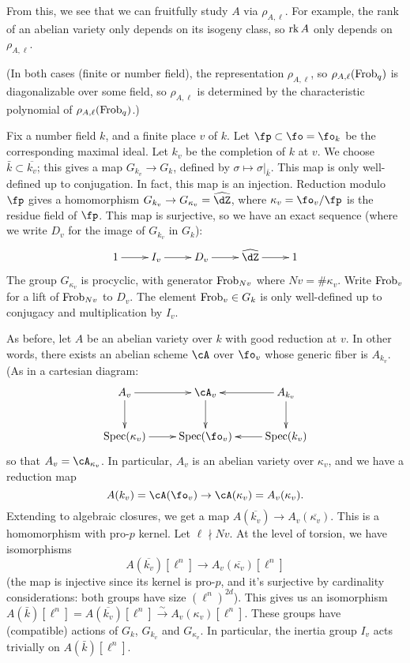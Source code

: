 From this, we see that we can fruitfully study $A$ via $\rho_{A,\ell}$. For 
example, the rank of an abelian variety only depends on its isogeny class, so 
$\operatorname{rk} A$ only depends on $\rho_{A,\ell}$. 

(In both cases (finite or number field), the representation 
$\rho_{A,\ell}$, so $\rho_{A,\ell}(\mathrm{Frob}_q)$ is diagonalizable over some 
field, so $\rho_{A,\ell}$ is determined by the characteristic polynomial of 
$\rho_{A,\ell}(\mathrm{Frob}_q)$.)

Fix a number field $k$, and a finite place $v$ of $k$. Let 
$\fp\subset \fo=\fo_k$ be the corresponding maximal ideal. Let $k_v$ be the 
completion of $k$ at $v$. We choose $\bar k\subset \overline{k_v}$; this gives 
a map $G_{k_v} \to G_k$, defined by $\sigma\mapsto \sigma|_{\bar k}$. This map 
is only well-defined up to conjugation. In fact, this map is an injection. 
Reduction modulo $\fp$ gives a homomorphism 
$G_{k_v} \to G_{\kappa_v}=\widehat\dZ$, where $\kappa_v = \fo_v/\fp$ is the 
residue field of $\fp$. This map is surjective, so we have an exact sequence 
(where we write $D_v$ for the image of $G_{k_v}$ in $G_k$):
\[\xymatrix{
  1 \ar[r] 
    & I_v \ar[r] 
    & D_v \ar[r] 
    & \widehat\dZ \ar[r] 
    & 1
}\]
The group $G_{\kappa_v}$ is procyclic, with generator 
$\mathrm{Frob}_{N v}$ where $N v = \# \kappa_v$. Write $\mathrm{Frob}_v$ for a lift of 
$\mathrm{Frob}_{N v}$ to $D_v$. The element $\mathrm{Frob}_v\in G_k$ is only well-defined up to 
conjugacy and multiplication by $I_v$. 

As before, let $A$ be an abelian variety over $k$ with good reduction at $v$. 
In other words, there exists an abelian scheme $\cA$ over $\fo_v$ whose generic 
fiber is $A_{k_v}$. (As in a cartesian diagram:
\[\xymatrix{
  A_v \ar[r] \ar[d] 
    & \cA_v \ar[d] 
    & A_{k_v} \ar[l] \ar[d] \\
  \spec(\kappa_v) \ar[r] 
    & \spec(\fo_v) 
    & \spec(k_v) \ar[l] 
}\]
so that $A_v = \cA_{\kappa_v}$. In particular, $A_v$ is an abelian variety over 
$\kappa_v$, and we have a reduction map 
\[
  A(k_v) = \cA(\fo_v) \to \cA(\kappa_v) = A_v(\kappa_v) \text{.}
\]
Extending to algebraic closures, we get a map 
$A(\overline{k_v}) \to A_v(\overline{\kappa_v})$. This is a homomorphism with 
pro-$p$ kernel. Let $\ell\nmid N v$. At the level of torsion, we have 
isomorphisms 
\[
  A(\overline{k_v})[\ell^n] \to A_v(\overline{\kappa_v})[\ell^n]
\]
(the map is injective since its kernel is pro-$p$, and it's surjective by 
cardinality considerations: both groups have size $(\ell^n)^{2 d}$). This gives 
us an isomorphism 
$A(\bar k)[\ell^n] = A(\overline{k_v})[\ell^n]\xrightarrow\sim A_v(\kappa_v)[\ell^n]$. 
These groups have (compatible) actions of $G_k$, $G_{k_v}$ and $G_{\kappa_v}$. In 
particular, the inertia group $I_v$ acts trivially on $A(\bar k)[\ell^n]$. 

